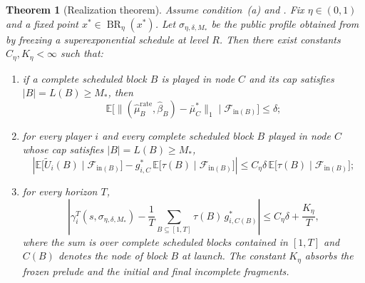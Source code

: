 \documentclass[12pt]{article}
\newtheorem{theorem}{Theorem}[section]
\theoremstyle{definition}
\newcommand{\E}{\mathbb{E}}
\newcommand{\1}{\mathbf{1}}
\newcommand{\cF}{\mathcal{F}}
\DeclareMathOperator{\BR}{BR}
\begin{document}
\begin{theorem}[Realization theorem]
\label{thm:realization}
Assume condition~\textnormal{(a)} and . Fix
$\eta\in(0,1)$ and a fixed point $x^*\in\BR_\eta(x^*)$. Let
$\sigma_{\eta,\delta,M_*}$ be the public profile obtained from
 by freezing a superexponential schedule at level $R$.
Then there exist constants $C_\eta,K_\eta<\infty$ such that:
\begin{enumerate}[label=\textnormal{(Q\arabic*)},leftmargin=2.8em]
\item if a complete scheduled block $B$ is played in node $C$ and its cap
satisfies $|B|=L(B)\ge M_*$, then
\begin{equation}
\label{eq:block-occupation-realization}
\E\bigl[\|(\widehat\mu_B^{\mathrm{rate}},\widehat\beta_B)-\bar\mu_C^*\|_1
\mid \cF_{\mathrm{in}(B)}\bigr]
\le \delta;
\end{equation}
\item for every player $i$ and every complete scheduled block $B$ played in node
$C$ whose cap satisfies $|B|=L(B)\ge M_*$,
\begin{equation}
\label{eq:block-payoff-realization}
\left|
\E\bigl[\widetilde U_i(B)\mid \cF_{\mathrm{in}(B)}\bigr]
-
g_{i,C}^*\,\E\bigl[\tau(B)\mid \cF_{\mathrm{in}(B)}\bigr]
\right|
\le C_\eta\delta\,\E\bigl[\tau(B)\mid \cF_{\mathrm{in}(B)}\bigr];
\end{equation}
\item for every horizon $T$,
\begin{equation}
\label{eq:realization-tail-bound}
\left|
\gamma_i^T(s,\sigma_{\eta,\delta,M_*})
-
\frac1T\sum_{B\subseteq [1,T]} \tau(B)\,g_{i,C(B)}^*
\right|
\le C_\eta\delta + \frac{K_\eta}{T},
\end{equation}
where the sum is over complete scheduled blocks contained in $[1,T]$ and $C(B)$
denotes the node of block $B$ at launch. The constant $K_\eta$ absorbs the
frozen prelude and the initial and final incomplete fragments.
\end{enumerate}
\end{theorem}
\end{document}
